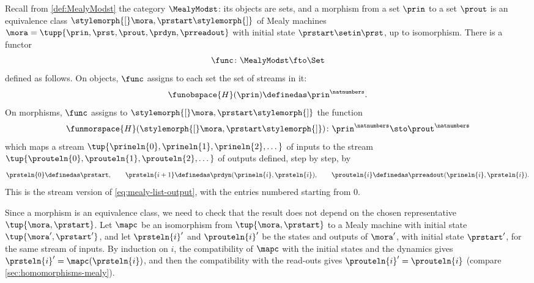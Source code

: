 \begin{example}
    \label{exa:mealy-action-streams}
    Recall from \cref{def:MealyModst} the category $\MealyModst$: its objects are sets, and a morphism from a set $\prin$ to a set $\prout$ is an equivalence class $\stylemorph{[}\mora, \prstart\stylemorph{]}$ of Mealy machines $\mora = \tupp{\prin, \prst, \prout, \prdyn, \prreadout}$ with initial state $\prstart \setin \prst$, up to isomorphism.
    There is a functor
    \begin{equation}
        \func \colon \MealyModst \fto \Set
    \end{equation}
    defined as follows.
    On objects, $\func$ assigns to each set the set of streams in it:
    \begin{equation}
        \funobspace{H}(\prin) \definedas \prin^{\natnumbers}.
    \end{equation}
    On morphisms, $\func$ assigns to $\stylemorph{[}\mora, \prstart\stylemorph{]}$ the function
    \begin{equation}
        \funmorspace{H}(\stylemorph{[}\mora, \prstart\stylemorph{]}) \colon \prin^{\natnumbers} \sto \prout^{\natnumbers}
    \end{equation}
    which maps a stream $\tup{\prineln{0}, \prineln{1}, \prineln{2}, \dots}$ of inputs to the stream $\tup{\prouteln{0}, \prouteln{1}, \prouteln{2}, \dots}$ of outputs defined, step by step, by
    \begin{equation}
        \label{eq:mealy-action-streams}
        \prsteln{0} \definedas \prstart,
        \qquad
        \prsteln{i+1} \definedas \prdyn(\prineln{i}, \prsteln{i}),
        \qquad
        \prouteln{i} \definedas \prreadout(\prineln{i}, \prsteln{i}).
    \end{equation}
    This is the stream version of \cref{eq:mealy-list-output}, with the entries numbered starting from $0$.

    Since a morphism is an equivalence class, we need to check that the result does not depend on the chosen representative $\tup{\mora, \prstart}$.
    Let $\mapc$ be an isomorphism from $\tup{\mora, \prstart}$ to a Mealy machine with initial state $\tup{\mora', \prstart'}$, and let $\prsteln{i}'$ and $\prouteln{i}'$ be the states and outputs of $\mora'$, with initial state $\prstart'$, for the same stream of inputs.
    By induction on $i$, the compatibility of $\mapc$ with the initial states and the dynamics gives $\prsteln{i}' = \mapc(\prsteln{i})$, and then the compatibility with the read-outs gives $\prouteln{i}' = \prouteln{i}$ (compare \cref{sec:homomorphisms-mealy}).


\end{example}
